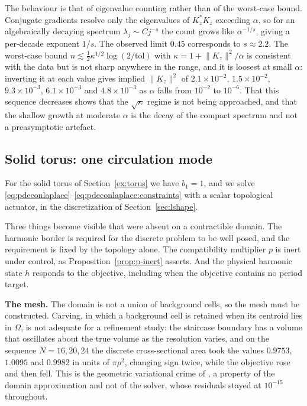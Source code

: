 \documentclass{article}
\newcommand{\norm}[1]{\lVert #1\rVert}
\begin{document}
The behaviour is that of eigenvalue counting rather than of the worst-case
bound. Conjugate gradients resolve only the eigenvalues of $K_{z}^{*}K_{z}$
exceeding $\alpha$, so for an algebraically decaying spectrum
$\lambda_{j}\sim Cj^{-s}$ the count grows like $\alpha^{-1/s}$, giving a
per-decade exponent $1/s$. The observed limit $0.45$ corresponds to
$s\approx2.2$. The worst-case bound
$n\lesssim\tfrac12\kappa^{1/2}\log(2/\mathrm{tol})$ with
$\kappa=1+\norm{K_{z}}^{2}/\alpha$ is consistent with the data but is not
sharp anywhere in the range, and it is loosest at small $\alpha$: inverting it
at each value gives implied $\norm{K_{z}}^{2}$ of $2.1\times10^{-2}$,
$1.5\times10^{-2}$, $9.3\times10^{-3}$, $6.1\times10^{-3}$ and
$4.8\times10^{-3}$ as $\alpha$ falls from $10^{-2}$ to $10^{-6}$. That this
sequence decreases shows that the $\sqrt{\kappa}$ regime is not being
approached, and that the shallow growth at moderate $\alpha$ is the decay of
the compact spectrum and not a preasymptotic artefact.

\subsection{Solid torus: one circulation mode}\label{sec:torus}

For the solid torus of Section~\ref{ex:torus} we have $b_{1}=1$, and we solve
\eqref{eq:pdeconlaplace}--\eqref{eq:pdeconlaplace:constraints} with a scalar
topological actuator, in the discretization of Section~\ref{sec:lshape}.

Three things become visible that were absent on a contractible domain. The
harmonic border is required for the discrete problem to be well posed, and the
requirement is fixed by the topology alone. The compatibility multiplier $p$
is inert under control, as Proposition~\ref{prop:p-inert} asserts. And the
physical harmonic state $h$ responds to the objective, including when the
objective contains no period target.

\medskip
\noindent\textbf{The mesh.}
The domain is not a union of background cells, so the mesh must be
constructed. Carving, in which a background cell is retained when its centroid
lies in $\Omega$, is not adequate for a refinement study: the staircase
boundary has a volume that oscillates about the true volume as the resolution
varies, and on the sequence $N=16,20,24$ the discrete cross-sectional area
took the values $0.9753$, $1.0095$ and $0.9982$ in units of $\pi\rho^{2}$,
changing sign twice, while the objective rose and then fell. This is the
geometric variational crime of \cite{HolstStern2012a}, a property of the
domain approximation and not of the solver, whose residuals stayed at
$10^{-15}$ throughout.
\end{document}
